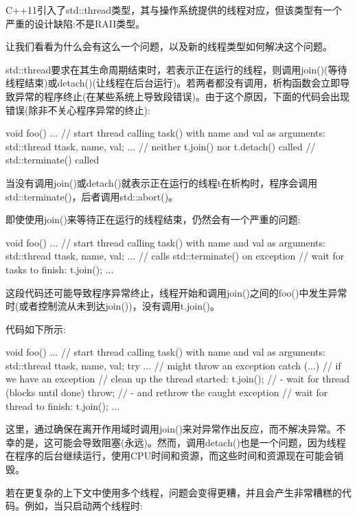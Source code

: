 
C++11引入了std::thread类型，其与操作系统提供的线程对应，但该类型有一个严重的设计缺陷:不是RAII类型。

让我们看看为什么会有这么一个问题，以及新的线程类型如何解决这个问题。


std::thread要求在其生命周期结束时，若表示正在运行的线程，则调用join()(等待线程结束)或detach()(让线程在后台运行)。若两者都没有调用，析构函数会立即导致异常的程序终止(在某些系统上导致段错误)。由于这个原因，下面的代码会出现错误(除非不关心程序异常的终止):

\begin{cpp}
void foo()
{
	...
	// start thread calling task() with name and val as arguments:
	std::thread t{task, name, val};
	... // neither t.join() nor t.detach() called
} // std::terminate() called
\end{cpp}

当没有调用join()或detach()就表示正在运行的线程t在析构时，程序会调用std::terminate()，后者调用std::abort()。

即使使用join()来等待正在运行的线程结束，仍然会有一个严重的问题:

\begin{cpp}
void foo()
{
	...
	// start thread calling task() with name and val as arguments:
	std::thread t{task, name, val};
	... // calls std::terminate() on exception
	// wait for tasks to finish:
	t.join();
	...
}
\end{cpp}

这段代码还可能导致程序异常终止，线程开始和调用join()之间的foo()中发生异常时(或者控制流从未到达join())，没有调用t.join()。

代码如下所示:

\begin{cpp}
void foo()
{
	...
	// start thread calling task() with name and val as arguments:
	std::thread t{task, name, val};
	try {
		... // might throw an exception
	}
	catch (...) { // if we have an exception
		// clean up the thread started:
		t.join(); // - wait for thread (blocks until done)
		throw; // - and rethrow the caught exception
	}
	// wait for thread to finish:
	t.join();
	...
}
\end{cpp}

这里，通过确保在离开作用域时调用join()来对异常作出反应，而不解决异常。不幸的是，这可能会导致阻塞(永远)。然而，调用detach()也是一个问题，因为线程在程序的后台继续运行，使用CPU时间和资源，而这些时间和资源现在可能会销毁。

若在更复杂的上下文中使用多个线程，问题会变得更糟，并且会产生非常糟糕的代码。例如，当只启动两个线程时:


